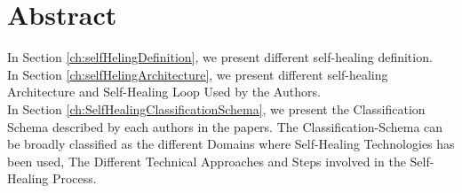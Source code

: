 \documentclass[a4paper,oneside]{scrreprt}
\begin{document}
\section*{Abstract}
In Section \ref{ch:selfHelingDefinition}, we present different self-healing definition.\\

In Section \ref{ch:selfHelingArchitecture}, we present different self-healing Architecture and Self-Healing Loop Used by the Authors.\\

In Section \ref{ch:SelfHealingClassificationSchema}, we present the Classification Schema described by each authors in the papers. The Classification-Schema can be broadly classified as the different Domains where Self-Healing Technologies has been used, The Different Technical Approaches and Steps involved in the Self-Healing Process.\\



\begin{versionhistory}

 
\end{versionhistory}


\tableofcontents
\cleardoublepage















\end{document}
